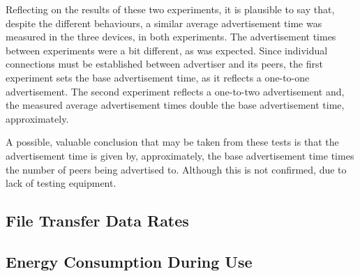 Reflecting on the results of these two experiments, it is plausible to say that, despite the different behaviours, a similar average advertisement time was measured in the three devices, in both experiments. The advertisement times between experiments were a bit different, as was expected. Since individual connections must be established between advertiser and its peers, the first experiment sets the base advertisement time, as it reflects a one-to-one advertisement. The second experiment reflects a one-to-two advertisement and, the measured average advertisement times double the base advertisement time, approximately.

A possible, valuable conclusion that may be taken from these tests is that the advertisement time is given by, approximately, the base advertisement time times the number of peers being advertised to. Although this is not confirmed, due to lack of testing equipment.

\subsection{File Transfer Data Rates}

\subsection{Energy Consumption During Use}




